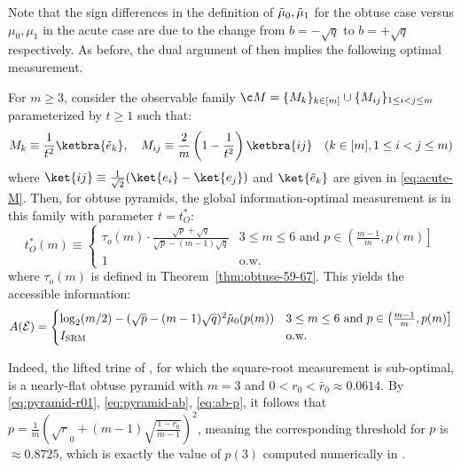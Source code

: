 \documentclass[11pt]{article}
\begin{document}
Note that the sign differences in the definition of $\Tilde \mu_0,\Tilde \mu_1$ for the obtuse case versus $\mu_0,\mu_1$ in the acute case are due to the change from $b=-\sqrt q $ to $b=+\sqrt q$ respectively. As before, the dual argument of \citep{holevo2025quantum} then implies the following optimal measurement.
\begin{corollary}\label{corr:obtuse-info}
   For $m\geq 3$, consider the observable family $\c M=\{M_k\}_{k\in [m]}\cup \{M_{ij}\}_{1\leq i<j\leq m}$ parameterized by $t\geq 1$ such that:
   \begin{equation}\label{eq:M-k-ij}
       M_k\equiv \frac 1 {t^2}\ketbra{\Tilde e_k},\quad M_{ij}\equiv \frac 2 m \left(1-\frac 1 {t^2}\right)\ketbra{ij}\quad (k\in[m],1\leq i<j\leq m)
   \end{equation}
   where $ \ket{ij}\equiv \frac 1 {\sqrt 2}(\ket{e_i}-\ket{e_j})$ and $\ket{\Tilde e_k}$ are given in \eqref{eq:acute-M}. Then, for obtuse pyramids, the global information-optimal measurement is in this family with parameter $t=t^*_{O}$:
   \begin{equation}
       t^*_O(m)\equiv \begin{cases}
          \tau_o(m)\cdot \frac{\sqrt p+\sqrt q}{\sqrt p-(m-1)\sqrt q} & 3\leq m \leq 6\text{ and }p\in \left(\frac{m-1}{m},p(m)\right]\\
          1 & \text{o.w.}
       \end{cases}
   \end{equation}
   where $\tau_o(m)$ is defined in Theorem~\ref{thm:obtuse-59-67}. This yields the accessible information:
   \begin{equation}
       A(\mathcal E )=\begin{cases}
       \log_2 (m/2)-(\sqrt p-(m-1)\sqrt q)^2\Tilde \mu_0(p(m)) & 3\leq m \leq 6 \text{ and } p\in \left(\frac{m-1}{m},p(m)\right]\\
       I_{\rm SRM} & \text{o.w.}
       \end{cases}
   \end{equation}
\end{corollary}
Indeed, the lifted trine of \citep{shor2002number}, for which the square-root measurement is sub-optimal, is a nearly-flat obtuse pyramid with $m=3$ and $0<r_0<\bar r_0\approx 0.0614$. By \eqref{eq:pyramid-r01}, \eqref{eq:pyramid-ab}, \eqref{eq:ab-p}, it follows that $p=\frac 1 m \left(\sqrt r_0+(m-1)\sqrt{\frac{1-r_0}{m-1}}\right)^2$, meaning the corresponding threshold for $p$ is $\approx 0.8725$, which is exactly the value of $p(3)$ computed numerically in \citep{holevo2025quantum}.
\end{document}
